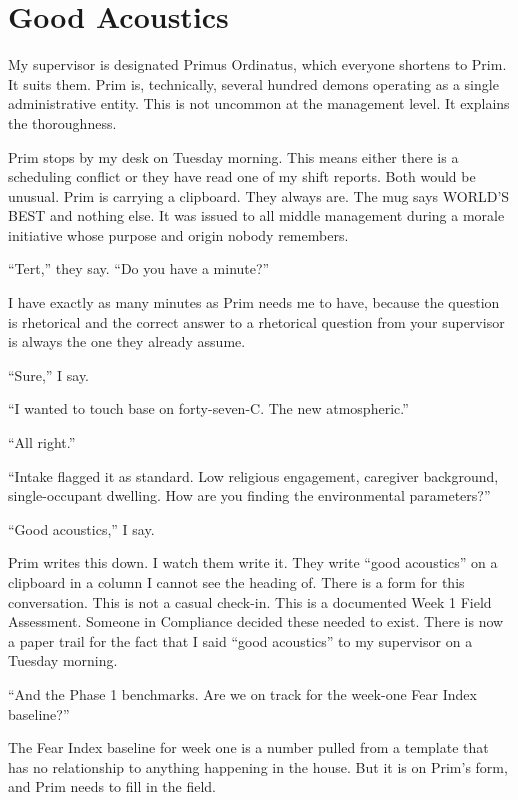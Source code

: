 
\chapter{Good Acoustics}

My supervisor is designated Primus Ordinatus, which everyone shortens to Prim. It suits them. Prim is, technically, several hundred demons operating as a single administrative entity. This is not uncommon at the management level. It explains the thoroughness.

Prim stops by my desk on Tuesday morning. This means either there is a scheduling conflict or they have read one of my shift reports. Both would be unusual. Prim is carrying a clipboard. They always are. The mug says WORLD'S BEST and nothing else. It was issued to all middle management during a morale initiative whose purpose and origin nobody remembers.

``Tert,'' they say. ``Do you have a minute?''

I have exactly as many minutes as Prim needs me to have, because the question is rhetorical and the correct answer to a rhetorical question from your supervisor is always the one they already assume.

``Sure,'' I say.

``I wanted to touch base on forty-seven-C. The new atmospheric.''

``All right.''

``Intake flagged it as standard. Low religious engagement, caregiver background, single-occupant dwelling. How are you finding the environmental parameters?''

``Good acoustics,'' I say.

Prim writes this down. I watch them write it. They write ``good acoustics'' on a clipboard in a column I cannot see the heading of. There is a form for this conversation. This is not a casual check-in. This is a documented Week 1 Field Assessment. Someone in Compliance decided these needed to exist. There is now a paper trail for the fact that I said ``good acoustics'' to my supervisor on a Tuesday morning.

``And the Phase 1 benchmarks. Are we on track for the week-one Fear Index baseline?''

The Fear Index baseline for week one is a number pulled from a template that has no relationship to anything happening in the house. But it is on Prim's form, and Prim needs to fill in the field.

